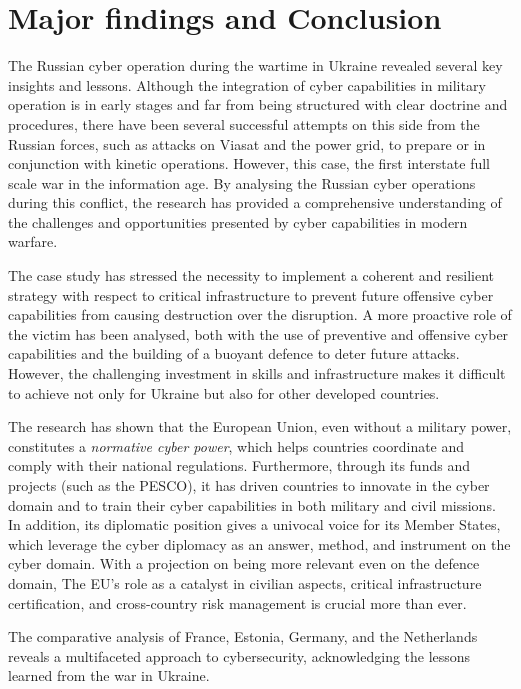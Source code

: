 \chapter*{Major findings and Conclusion}
{}

The Russian cyber operation during the wartime in Ukraine revealed several key insights and lessons. Although the integration of cyber capabilities in military operation is in early stages and far from being structured with clear doctrine and procedures, there have been several successful attempts on this side from the Russian forces, such as attacks on Viasat and the power grid, to prepare or in conjunction with kinetic operations. However, this case, the first interstate full scale war in the information age. By analysing the Russian cyber operations during this conflict, the research has provided a comprehensive understanding of the challenges and opportunities presented by cyber capabilities in modern warfare. 

The case study has stressed the necessity to implement a coherent and resilient strategy with respect to critical infrastructure to prevent future offensive cyber capabilities from causing destruction over the disruption. A more proactive role of the victim has been analysed, both with the use of preventive and offensive cyber capabilities and the building of a buoyant defence to deter future attacks. However, the challenging investment in skills and infrastructure makes it difficult to achieve not only for Ukraine but also for other developed countries. 

The research has shown that the European Union, even without a military power, constitutes a \textit{normative cyber power}, which helps countries coordinate and comply with their national regulations. Furthermore, through its funds and projects (such as the PESCO), it has driven countries to innovate in the cyber domain and to train their cyber capabilities in both military and civil missions. In addition, its diplomatic position gives a univocal voice for its Member States, which leverage the cyber diplomacy as an answer, method, and instrument on the cyber domain. With a projection on being more relevant even on the defence domain, The EU's role as a catalyst in civilian aspects, critical infrastructure certification, and cross-country risk management is crucial more than ever. 

The comparative analysis of France, Estonia, Germany, and the Netherlands reveals a multifaceted approach to cybersecurity, acknowledging the lessons learned from the war in Ukraine. 


